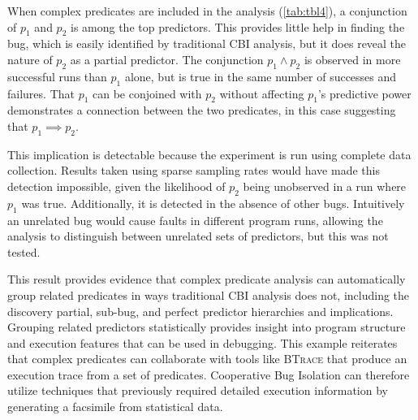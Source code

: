 When complex predicates are included in the analysis (\autoref{tab:tbl4}), a conjunction of $p_1$ and $p_2$ is among the top predictors.  This provides little help in finding the bug, which is easily identified by traditional CBI analysis, but it does reveal the nature of $p_2$ as a partial predictor.  The conjunction $p_1 \wedge p_2$ is observed in more successful runs than $p_1$ alone, but is true in the same number of successes and failures.  That $p_1$ can be conjoined with $p_2$ without affecting $p_1$'s predictive power demonstrates a connection between the two predicates, in this case suggesting that $p_1 \implies p_2$.

This implication is detectable because the experiment is run using complete data collection.  Results taken using sparse sampling rates would have made this detection impossible, given the likelihood of $p_2$ being unobserved in a run where $p_1$ was true.  Additionally, it is detected in the absence of other bugs.  Intuitively an unrelated bug would cause faults in different program runs, allowing the analysis to distinguish between unrelated sets of predictors, but this was not tested.

This result provides evidence that complex predicate analysis can automatically group related predicates in ways traditional CBI analysis does not, including the discovery partial, sub-bug, and perfect predictor hierarchies and implications.  Grouping related predictors statistically provides insight into program structure and execution features that can be used in debugging.  This example reiterates that complex predicates can collaborate with tools like \textsc{BTrace} that produce an execution trace from a set of predicates.  Cooperative Bug Isolation can therefore utilize techniques that previously required detailed execution information by generating a facsimile from statistical data.


